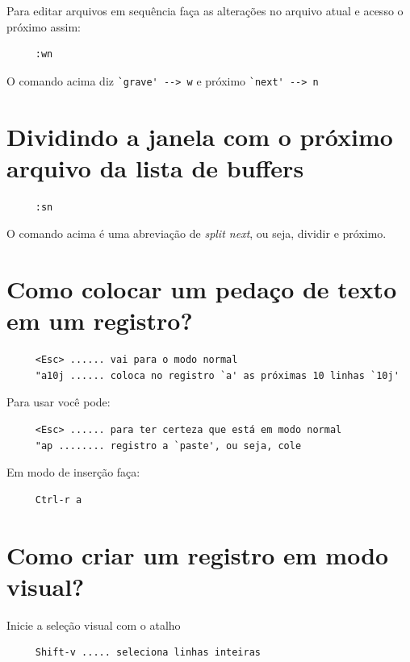 \documentclass[10pt,a4paper,openany]{book}
\begin{document}
Para editar arquivos em sequência faça as alterações no arquivo atual
e acesso o próximo assim:

\begin{verbatim}
     :wn
\end{verbatim}

O comando acima diz \verb|`grave' --> w|  e próximo \verb|`next' --> n|

\section{Dividindo a janela com o próximo arquivo da lista de buffers}
\label{Dividindo a janela com o próximo arquivo da lista de buffers}

\begin{verbatim}
     :sn
\end{verbatim}

O comando acima é uma abreviação de {\em split next}, ou seja, dividir e próximo.

\section{Como colocar um pedaço de texto em um registro?}
\label{Como colocar um pedaço de texto em um registro?}

\begin{verbatim}
     <Esc> ...... vai para o modo normal
     "a10j ...... coloca no registro `a' as próximas 10 linhas `10j'
\end{verbatim}

Para usar você pode:

\begin{verbatim}
     <Esc> ...... para ter certeza que está em modo normal
     "ap ........ registro a `paste', ou seja, cole
\end{verbatim}

Em modo de inserção faça:

\begin{verbatim}
     Ctrl-r a
\end{verbatim}

\section{Como criar um registro em modo visual?}
\label{Como criar um registro em modo visual?}
Inicie a seleção visual com o atalho

\begin{verbatim}
     Shift-v ..... seleciona linhas inteiras
\end{verbatim}
\end{document}
